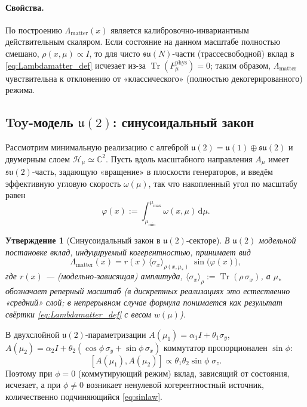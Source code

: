 \documentclass[11pt,a4paper]{article}
\DeclareMathOperator{\Tr}{Tr}
\newcommand{\dd}{\mathrm{d}}
\theoremstyle{definition}
\theoremstyle{plain}
\newtheorem{proposition}{Утверждение}[section]
\theoremstyle{remark}
\begin{document}
\paragraph{Свойства.}
По построению $\Lambda_{\mathrm{matter}}(x)$ является калибровочно-инвариантным действительным скаляром.
Если состояние на данном масштабе полностью смешано, $\rho(x,\mu)\propto I$, то для чисто $\mathfrak{su}(N)$-части
(трассесвободной) вклад в \eqref{eq:Lambdamatter_def} исчезает из-за $\Tr(F_{\mu}^{\mathrm{phys}})=0$;
таким образом, $\Lambda_{\mathrm{matter}}$ чувствительна к отклонению от «классического» (полностью декогерированного) режима.

\subsection[Toy-модель u(2): синусоидальный закон]{Toy-модель $\mathfrak{u}(2)$: синусоидальный закон}
\label{sec:theory:sinlaw}

Рассмотрим минимальную реализацию с алгеброй $\mathfrak{u}(2)=\mathfrak{u}(1)\oplus\mathfrak{su}(2)$ и
двумерным слоем $\mathcal H_\mu\simeq\mathbb C^2$.
Пусть вдоль масштабного направления $A_\mu$ имеет $\mathfrak{su}(2)$-часть, задающую «вращение» в плоскости генераторов,
и введём эффективную угловую скорость $\omega(\mu)$, так что накопленный угол по масштабу равен
\begin{equation}\label{eq:phi_total}
\varphi(x) := \int_{\mu_{\min}}^{\mu_{\max}}\omega(x,\mu)\,\dd\mu.
\end{equation}

\begin{proposition}[Синусоидальный закон в $\mathfrak{u}(2)$-секторе]\label{prop:sinlaw}
В $\mathfrak{u}(2)$ модельной постановке вклад, индуцируемый когерентностью, принимает вид
\begin{equation}\label{eq:sinlaw}
\Lambda_{\mathrm{matter}}(x)
=
r(x)\,\langle \sigma_x\rangle_{\rho(x,\mu_\ast)}\;
\sin\!\bigl(\varphi(x)\bigr),
\end{equation}
где $r(x)$ — (модельно-зависящая) амплитуда,
$\langle \sigma_x\rangle_{\rho} := \Tr(\rho\,\sigma_x)$, а $\mu_\ast$ обозначает реперный масштаб
(в дискретных реализациях это естественно «средний» слой; в непрерывном случае формула понимается как результат
свёртки \eqref{eq:Lambdamatter_def} с весом $w(\mu)$).
\end{proposition}

В двухслойной $\mathfrak u(2)$-параметризации
$A(\mu_1)=\alpha_1I+\theta_1\sigma_y$,
$A(\mu_2)=\alpha_2I+\theta_2(\cos\phi\,\sigma_y+\sin\phi\,\sigma_x)$
коммутатор пропорционален $\sin\phi$:
\[
[A(\mu_1),A(\mu_2)] \propto \theta_1\theta_2\sin\phi\;\sigma_z.
\]
Поэтому при $\phi=0$ (коммутирующий режим) вклад, зависящий от состояния, исчезает, а при $\phi\neq 0$
возникает ненулевой когерентностный источник, количественно подчиняющийся \eqref{eq:sinlaw}.
\end{document}
